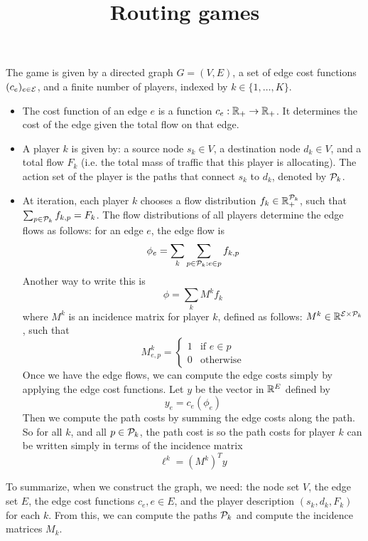 \documentclass[10pt,a4paper]{article}
\title{Routing games}
\date{}
\begin{document}
\maketitle


The game is given by a directed graph $G = (V, E)$, a set of edge cost functions $(c_e)_{e \in \mathcal{E}}$, and a finite number of players, indexed by $k \in \{1, \dots, K\}$.

\begin{itemize}
\item The cost function of an edge $e$ is a function $c_e : \mathbb{R}_+ \to \mathbb{R}_+$. It determines the cost of the edge given the total flow on that edge.
\item A player $k$ is given by: a source node $s_k \in V$, a destination node $d_k \in V$, and a total flow $F_k$ (i.e. the total mass of traffic that this player is allocating). The action set of the player is the paths that connect $s_k$ to $d_k$, denoted by $\mathcal{P}_k$.
\item At iteration, each player $k$ chooses a flow distribution $f_k \in \mathbb{R}_+^{\mathcal{P}_k}$, such that $\sum_{p \in \mathcal{P}_k} f_{k,p} = F_k$. The flow distributions of all players determine the edge flows as follows: for an edge $e$, the edge flow is
\[
\phi_e = \sum_k \sum_{p \in \mathcal{P}_k : e \in p} f_{k, p}
\]
Another way to write this is
\[
\phi = \sum_{k} M^k f_k
\]
where $M^k$ is an incidence matrix for player $k$, defined as follows: $M^k \in \mathbb{R}^{\mathcal{E} \times \mathcal{P}_k}$, such that 
\[
M^k_{e, p} = \begin{cases}
1 & \text{if $e \in p$} \\
0 & \text{otherwise}
\end{cases}
\]
Once we have the edge flows, we can compute the edge costs simply by applying the edge cost functions. Let $y$ be the vector in $\mathbb{R}^{E}$ defined by
\[
y_e = c_e(\phi_e)
\]
Then we compute the path costs by summing the edge costs along the path. So for all $k$, and all $p \in \mathcal{P}_k$, the path cost is
so the path costs for player $k$ can be written simply in terms of the incidence matrix
\[
\ell^k = (M^k)^T y
\]
\end{itemize}

To summarize, when we construct the graph, we need: the node set $V$, the edge set $E$, the edge cost functions $c_e, e \in E$, and the player description $(s_k, d_k, F_k)$ for each $k$. From this, we can compute the paths $\mathcal{P}_k$ and compute the incidence matrices $M_k$. 
\end{document}
